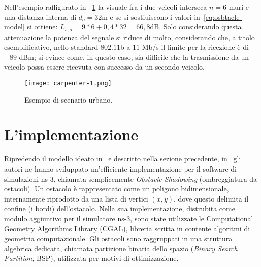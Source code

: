 Nell'esempio raffigurato in \figurename~\ref{fig:scenario-urbano-1} la visuale fra i due veicoli interseca $n=6$ muri e una distanza interna di $d_o=32$m
e se si sostiuiscono i valori in~\ref{eq:osbtacle-model} si ottiene: $L_{s,o} = 9*6 + 0,4*32 = 66,8$dB.
Solo considerando questa attenuazione la potenza del segnale si riduce di molto, considerando che,
a titolo esemplificativo, nello standard $802.11$b a $11$ Mb/s il limite per la ricezione è di $-89$ dBm;
si evince come, in questo caso, sia difficile che la trasmissione da un veicolo
possa essere ricevuta con successo da un secondo veicolo.
%
\begin{figure}[htbp]
	\centering
		\texttt{[image: carpenter-1.png]}
\caption{Esempio di scenario urbano.\label{fig:scenario-urbano-1}}
\end{figure}
%
%
\section{L'implementazione}\label{sec:implementazione}
Ripredendo il modello ideato in~\cite{5720204} e descritto nella sezione precedente, in~\cite{Carpenter:2015:OMI:2756509.2756512} gli autori ne hanno sviluppato
un'efficiente implementazione per il software di simulazioni ns-3, chiamata semplicemente \textit{Obstacle Shadowing} (ombreggiatura da ostacoli).
Un ostacolo è rappresentato come un poligono bidimensionale, internamente riprodotto da una lista di vertici $(x,y)$, dove questo delimita
il confine (i bordi) dell'ostacolo.
Nella sua implementazione, distrubita come modulo aggiuntivo per il simulatore ns-3,
sono state utilizzate le Computational Geometry Algorithms Library (CGAL), libreria scritta in \Cpp contente algoritmi di geometria computazionale.
Gli ostacoli sono raggruppati in una struttura algebrica dedicata, chiamata partizione binaria dello spazio (\textit{Binary Search Partition}, BSP), utilizzata
per motivi di ottimizzazione.

